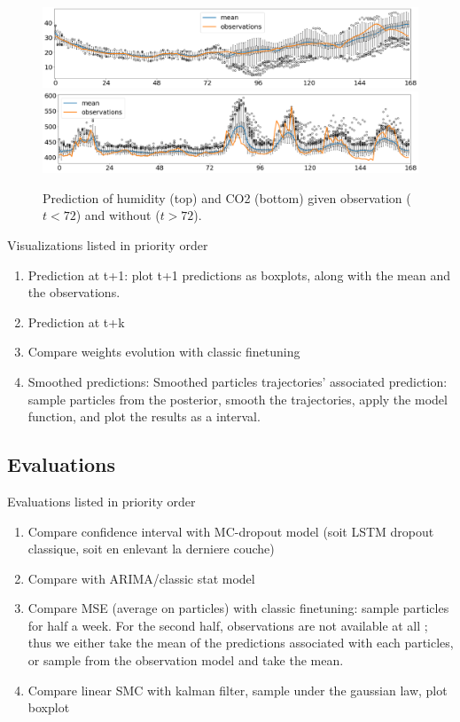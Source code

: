 \documentclass{article}
\begin{document}
\begin{figure}[htpb]
	\centering
	\includegraphics[width=\linewidth]{filter_kp24_hum.png}
	\includegraphics[width=\linewidth]{filter_kp24_co2.png}
	\caption{Prediction of humidity (top) and CO2 (bottom) given observation ($t<72$) and without ($t > 72$).}%
	\label{fig:filter_k+24}
\end{figure}

Visualizations listed in priority order
\begin{enumerate}
	\item Prediction at t+1: plot t+1 predictions as boxplots, along with the mean and the observations.
	\item Prediction at t+k
	\item Compare weights evolution with classic finetuning
	\item Smoothed predictions: Smoothed particles trajectories' associated prediction: sample particles from the posterior, smooth the trajectories, apply the model function, and plot the results as a interval.
\end{enumerate}

\subsection{Evaluations}%
\label{sub:evaluations}

Evaluations listed in priority order
\begin{enumerate}
	\item Compare confidence interval with MC-dropout model (soit LSTM dropout classique, soit en enlevant la derniere couche)
	\item Compare with ARIMA/classic stat model
	\item Compare MSE (average on particles) with classic finetuning: sample particles for half a week. For the second half, observations are not available at all ; thus we either take the mean of the predictions associated with each particles, or sample from the observation model and take the mean.
	\item Compare linear SMC with kalman filter, sample under the gaussian law, plot boxplot
\end{enumerate}
\end{document}
